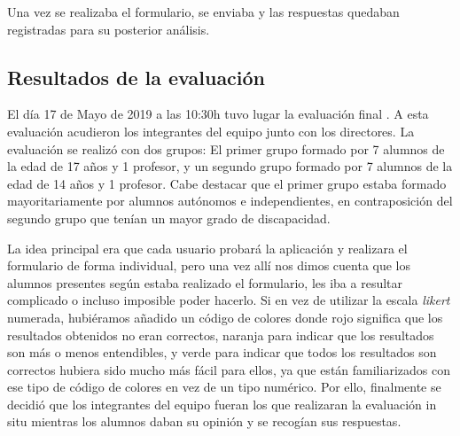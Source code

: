  	Una vez se realizaba el formulario, se enviaba y las respuestas quedaban registradas para su posterior análisis. 

\subsection{Resultados de la evaluación}
\label{cap:subsec:resultadosEvaluacion}
El día 17 de Mayo de 2019 a las 10:30h tuvo lugar la evaluación final . A esta evaluación acudieron los integrantes del equipo junto con los directores.
La evaluación se realizó con dos grupos: El primer grupo formado por 7 alumnos de la edad de 17 años y 1 profesor, y un segundo grupo formado por 7 alumnos de la edad de 14 años y 1 profesor.
Cabe destacar que el primer grupo estaba formado mayoritariamente por alumnos autónomos e independientes, en contraposición del segundo grupo que tenían un mayor grado de discapacidad.

La idea principal era que cada usuario probará la aplicación y realizara el formulario de forma individual, pero una vez allí nos dimos cuenta que los alumnos presentes según estaba realizado el formulario, les iba a resultar complicado o incluso imposible poder hacerlo. Si en vez de utilizar la escala \textit{likert} numerada, hubiéramos añadido un código de colores donde rojo significa que los resultados obtenidos no eran correctos, naranja para indicar que los resultados son más o menos entendibles, y verde para indicar que todos los resultados son correctos hubiera sido mucho más fácil para ellos, ya que están familiarizados con ese tipo de código de colores en vez de un tipo numérico.  Por ello, finalmente se decidió que los integrantes del equipo fueran los que realizaran la evaluación in situ mientras los alumnos daban su opinión y se recogían sus respuestas.

